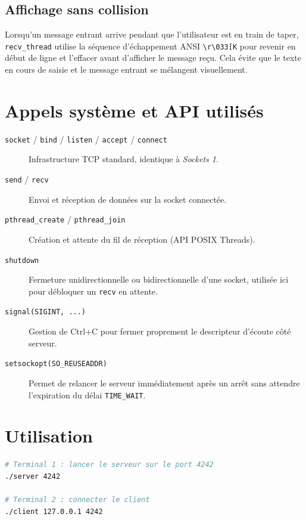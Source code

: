 \documentclass[12pt,a4paper]{article}
\begin{document}
\subsection{Affichage sans collision}

Lorsqu'un message entrant arrive pendant que l'utilisateur est en train de
taper, \texttt{recv\_thread} utilise la séquence d'échappement ANSI
\texttt{\textbackslash r\textbackslash 033[K} pour revenir en début de ligne
et l'effacer avant d'afficher le message reçu. Cela évite que le texte en
cours de saisie et le message entrant se mélangent visuellement.

\section{Appels système et API utilisés}

\begin{description}
    \item[\texttt{socket} / \texttt{bind} / \texttt{listen} / \texttt{accept} / \texttt{connect}]
        Infrastructure TCP standard, identique à \emph{Sockets 1}.
    \item[\texttt{send} / \texttt{recv}]
        Envoi et réception de données sur la socket connectée.
    \item[\texttt{pthread\_create} / \texttt{pthread\_join}]
        Création et attente du fil de réception (API POSIX Threads).
    \item[\texttt{shutdown}]
        Fermeture unidirectionnelle ou bidirectionnelle d'une socket,
        utilisée ici pour débloquer un \texttt{recv} en attente.
    \item[\texttt{signal(SIGINT, ...)}]
        Gestion de Ctrl+C pour fermer proprement le descripteur d'écoute
        côté serveur.
    \item[\texttt{setsockopt(SO\_REUSEADDR)}]
        Permet de relancer le serveur immédiatement après un arrêt sans
        attendre l'expiration du délai \texttt{TIME\_WAIT}.
\end{description}

\section{Utilisation}

\begin{lstlisting}[language=bash, style=cstyle]
# Terminal 1 : lancer le serveur sur le port 4242
./server 4242

# Terminal 2 : connecter le client
./client 127.0.0.1 4242
\end{lstlisting}
\end{document}
